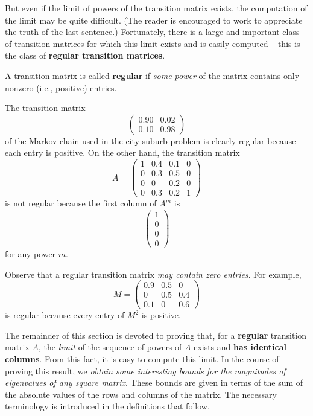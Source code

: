 But even if the limit of powers of the transition matrix exists, the computation of the limit may be quite difficult.
(The reader is encouraged to work  to appreciate the truth of the last sentence.)
Fortunately, there is a large and important class of transition matrices for which this limit exists and is easily computed -- this is the class of \textbf{regular transition matrices}.

\begin{definition} \label{def 5.11}
A transition matrix is called \textbf{regular} if \emph{some power} of the matrix contains only nonzero (i.e., positive) entries.
\end{definition}

\begin{example} \label{example 5.3.2}
The transition matrix
\[
    \begin{pmatrix} 0.90 & 0.02 \\ 0.10 & 0.98 \end{pmatrix}
\]
of the Markov chain used in the city-suburb problem is clearly regular because each entry is positive.
On the other hand, the transition matrix
\[
    A = \begin{pmatrix}
        1 & 0.4 & 0.1 & 0 \\
        0 & 0.3 & 0.5 & 0 \\
        0 & 0 & 0.2 & 0 \\
        0 & 0.3 & 0.2 & 1
    \end{pmatrix}
\]
is not regular because the first column of \(A^m\) is
\[
    \begin{pmatrix} 1 \\ 0 \\ 0 \\ 0 \end{pmatrix}
\]
for any power \(m\).

Observe that a regular transition matrix \emph{may contain zero entries}.
For example,
\[
    M = \begin{pmatrix} 0.9 & 0.5 & 0 \\ 0 & 0.5 & 0.4 \\ 0.1 & 0 & 0.6 \end{pmatrix}
\]
is regular because every entry of \(M^2\) is positive.
\end{example}

\begin{remark} \label{remark 5.3.6}
The remainder of this section is devoted to proving that, for a \textbf{regular} transition matrix \(A\), the \emph{limit} of the sequence of powers of \(A\) exists and \textbf{has identical columns}.
From this fact, it is easy to compute this limit.
In the course of proving this result, we \emph{obtain some interesting bounds for the magnitudes of eigenvalues of any square matrix}.
These bounds are given in terms of the sum of the absolute values of the rows and columns of the matrix.
The necessary terminology is introduced in the definitions that follow.
\end{remark}

